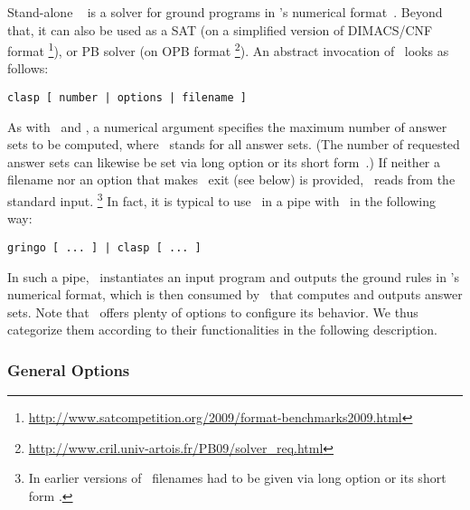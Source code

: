 Stand-alone \clasp~\cite{gekanesc07b} is a solver for ground programs in
\lparse's numerical format~\cite{lparseManual}. Beyond that, it can also
be used as a SAT (on a simplified version of DIMACS/CNF format%
\footnote{%
\url{http://www.satcompetition.org/2009/format-benchmarks2009.html}
}), or PB solver (on OPB format%
\footnote{%
\url{http://www.cril.univ-artois.fr/PB09/solver_req.html}
}).
An abstract invocation of \clasp\ looks as follows:
%
\begin{lstlisting}[numbers=none]
clasp [ number | options | filename ]
\end{lstlisting}
%
As with \clingo\ and \iclingo,
a numerical argument specifies the maximum number of answer sets to be computed,
where ~stands for all answer sets.
(The number of requested answer sets can likewise be set via long option
  or its short form~.)
If neither a filename nor an option that makes \clasp\ exit (see below) is provided,
\clasp\ reads from the standard input.%
\footnote{%
 In earlier versions of \clasp\ filenames had to be given via long option  
 or its short form .}
In fact, it is typical to use \clasp\ in a pipe with \gringo\ in the following way:
\begin{lstlisting}[numbers=none]
gringo [ ... ] | clasp [ ... ]
\end{lstlisting}
In such a pipe, \gringo\ instantiates an input program and outputs the ground
rules in \lparse's numerical format,
which is then consumed by \clasp\ that computes and outputs answer sets.
Note that \clasp\ offers plenty of options to configure its behavior.
We thus categorize them according to their functionalities in the following description.


\subsubsection{General Options}\label{subsec:clasp:general}

